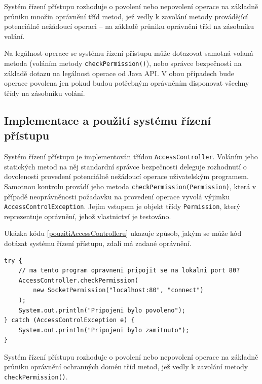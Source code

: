 Systém řízení přístupu rozhoduje o povolení nebo nepovolení operace na základně průniku množin oprávnění tříd metod, jež vedly k zavolání metody provádějící potenciálně nežádoucí operaci -- na základě průniku oprávnění tříd na zásobníku volání.

Na legálnost operace se systému řízení přístupu může dotazovat samotná volaná metoda (voláním metody {\tt checkPermission()}), nebo správce bezpečnosti na základě dotazu na legálnost operace od Java API. V obou případech bude operace povolena jen pokud budou potřebným oprávněním disponovat všechny třídy na zásobníku volání.

\subsection{Implementace a použití systému řízení přístupu}\label{implementaceAC}

Systém řízení přístupu je implementován třídou {\tt AccessController}. Voláním jeho statických metod na něj standardní správce bezpečnosti deleguje rozhodnutí o dovolenosti provedení potenciálně nežádoucí operace uživatelským programem. Samotnou kontrolu provádí jeho metoda {\tt checkPermission(Permission)}, která v případě neoprávněnosti požadavku na provedení operace vyvolá výjimku {\tt AccessControlException}. Jejím vstupem je objekt třídy {\tt Permission}, který reprezentuje oprávnění, jehož vlastnictví je testováno. \cite[5.5]{oaks}\cite[6]{oaks}

Ukázka kódu \ref{pouzitiAccessControlleru} ukazuje způsob, jakým se může kód dotázat systému řízení přístupu, zdali má zadané oprávnění. \cite[5.5]{oaks}

\begin{lstlisting}[caption=Příklad použití systému řízení přístupu, label=pouzitiAccessControlleru]
try {
    // ma tento program opravneni pripojit se na lokalni port 80?
    AccessController.checkPermission(
        new SocketPermission("localhost:80", "connect")
    );
    System.out.println("Pripojeni bylo povoleno");
} catch (AccessControlException e) {
    System.out.println("Pripojeni bylo zamitnuto");
}
\end{lstlisting}

Systém řízení přístupu rozhoduje o povolení nebo nepovolení operace na základně průniku oprávnění ochranných domén tříd metod, jež vedly k zavolání metody {\tt checkPermission()}. \cite[5.5]{oaks}\cite[6.1]{oaks}

